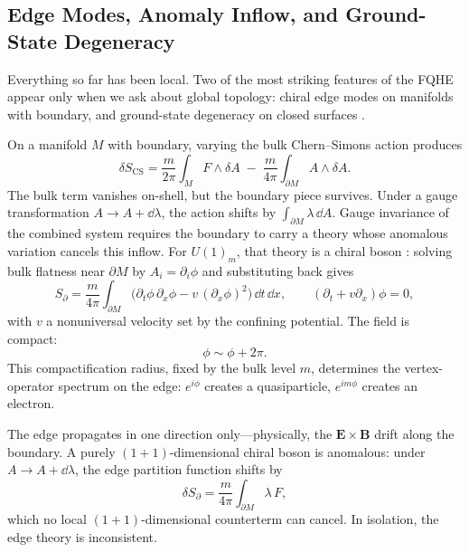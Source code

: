 \subsection{Edge Modes, Anomaly Inflow, and Ground-State Degeneracy}
\label{subsec:edges-degeneracy}

Everything so far has been local. Two of the most striking features of the FQHE appear only when we ask about global topology: chiral edge modes on manifolds with boundary, and ground-state degeneracy on closed surfaces \cite{Wen1995TopologicalOrdersEdgeExcitations,WenNiu1990GroundStateDegeneracy}.

On a manifold $M$ with boundary, varying the bulk Chern--Simons action produces
\begin{equation}
  \delta S_{\mathrm{CS}}
  =
  \frac{m}{2\pi}\int_{M}F\wedge\delta A
  \;-\;
  \frac{m}{4\pi}\int_{\partial M}A\wedge\delta A.
  \label{eq:fqhe-boundary-variation}
\end{equation}
The bulk term vanishes on-shell, but the boundary piece survives. Under a gauge transformation $A\to A+\dd\lambda$, the action shifts by $\int_{\partial M}\lambda\,\dd A$. Gauge invariance of the combined system requires the boundary to carry a theory whose anomalous variation cancels this inflow. For $U(1)_m$, that theory is a chiral boson \cite{Wen1995TopologicalOrdersEdgeExcitations}: solving bulk flatness near $\partial M$ by $A_i = \partial_i\phi$ and substituting back gives
\begin{equation}
  S_{\partial}
  =
  \frac{m}{4\pi}\int_{\partial M}
  \bigl(\partial_t\phi\,\partial_x\phi
  - v\,(\partial_x\phi)^2\bigr)\,\dd t\,\dd x,
  \qquad
  (\partial_t + v\partial_x)\phi = 0,
  \label{eq:fqhe-chiral-boson}
\end{equation}
with $v$ a nonuniversal velocity set by the confining potential. The field is compact:
\begin{equation}
  \phi \sim \phi + 2\pi.
  \label{eq:fqhe-compactification}
\end{equation}
This compactification radius, fixed by the bulk level $m$, determines the vertex-operator spectrum on the edge: $e^{i\phi}$ creates a quasiparticle, $e^{im\phi}$ creates an electron.

The edge propagates in one direction only---physically, the $\mathbf{E}\times\mathbf{B}$ drift along the boundary. A purely $(1{+}1)$-dimensional chiral boson is anomalous: under $A\to A+\dd\lambda$, the edge partition function shifts by
\begin{equation}
  \delta S_{\partial} = \frac{m}{4\pi}\int_{\partial M}\lambda\,F,
  \label{eq:fqhe-edge-anomaly}
\end{equation}
which no local $(1{+}1)$-dimensional counterterm can cancel. In isolation, the edge theory is inconsistent.

